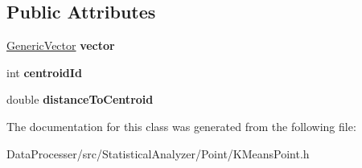\subsection*{Public Attributes}
\begin{DoxyCompactItemize}
\item 
\mbox{\label{classKMeansPoint_ac0d5896b28a976d3bd362b97c120fc18}} 
\hyperlink{classGenericVector}{Generic\+Vector} {\bfseries vector}
\item 
\mbox{\label{classKMeansPoint_abe666a20a19553a8b37ae038e4cb233a}} 
int {\bfseries centroid\+Id}
\item 
\mbox{\label{classKMeansPoint_a91518c65de711345cefd4f3fcc341471}} 
double {\bfseries distance\+To\+Centroid}
\end{DoxyCompactItemize}


The documentation for this class was generated from the following file\+:\begin{DoxyCompactItemize}
\item 
Data\+Processer/src/\+Statistical\+Analyzer/\+Point/K\+Means\+Point.\+h\end{DoxyCompactItemize}
